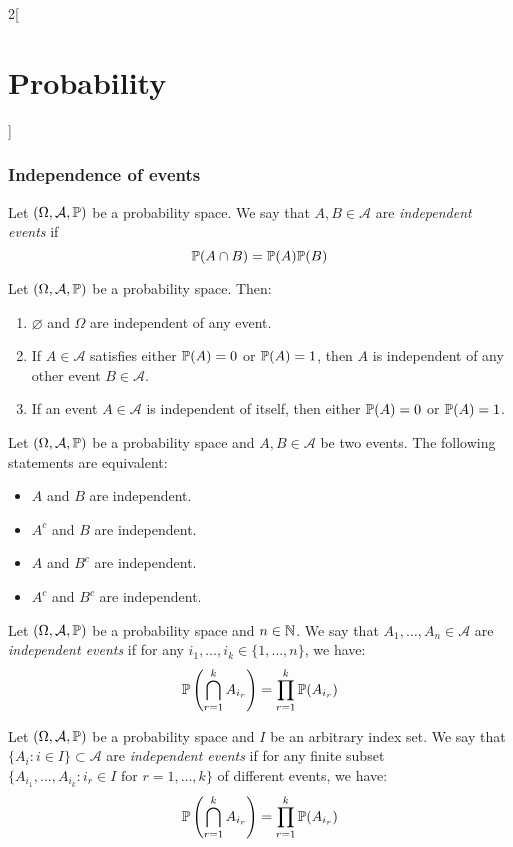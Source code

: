 \documentclass[../../../main_math.tex]{subfiles}
\begin{document}
\begin{multicols}{2}[\section{Probability}]
  \subsubsection{Independence of events}
  \begin{definition}
    Let $(\Omega,\mathcal{A},\mathbb{P})$ be a probability space. We say that $A,B\in\mathcal{A}$ are \emph{independent events} if $$\mathbb{P}(A\cap B)=\mathbb{P}(A)\mathbb{P}(B)$$
  \end{definition}
  \begin{proposition}
    Let $(\Omega,\mathcal{A},\mathbb{P})$ be a probability space. Then:
    \begin{enumerate}
      \item $\varnothing$ and $\Omega$ are independent of any event.
      \item If $A\in\mathcal{A}$ satisfies either $\mathbb{P}(A)=0$ or $\mathbb{P}(A)=1$, then $A$ is independent of any other event $B\in\mathcal{A}$.
      \item If an event $A\in\mathcal{A}$ is independent of itself, then either $\mathbb{P}(A)=0$ or $\mathbb{P}(A)=1$.
    \end{enumerate}
  \end{proposition}
  \begin{proposition}
    Let $(\Omega,\mathcal{A},\mathbb{P})$ be a probability space and $A,B\in\mathcal{A}$ be two events. The following statements are equivalent:
    \begin{itemize}
      \item $A$ and $B$ are independent.
      \item $A^c$ and $B$ are independent.
      \item $A$ and $B^c$ are independent.
      \item $A^c$ and $B^c$ are independent.
    \end{itemize}
  \end{proposition}
  \begin{definition}
    Let $(\Omega,\mathcal{A},\mathbb{P})$ be a probability space and $n\in\mathbb{N}$. We say that $A_1,\ldots,A_n\in\mathcal{A}$ are \emph{independent events} if for any $i_1,\ldots,i_k\in\{1,\ldots,n\}$, we have: $$\mathbb{P}\left(\bigcap_{r=1}^kA_{i_r}\right)=\prod_{r=1}^k\mathbb{P}(A_{i_r})$$
  \end{definition}
  \begin{definition}
    Let $(\Omega,\mathcal{A},\mathbb{P})$ be a probability space and $I$ be an arbitrary index set. We say that $\{A_i:i\in I\}\subset\mathcal{A}$ are \emph{independent events} if for any finite subset $\{A_{i_1},\ldots, A_{i_k}:i_r\in I\text{ for }r=1,\ldots,k\}$ of different events, we have: $$\mathbb{P}\left(\bigcap_{r=1}^kA_{i_r}\right)=\prod_{r=1}^k\mathbb{P}(A_{i_r})$$
  \end{definition}

\end{multicols}
\end{document}
